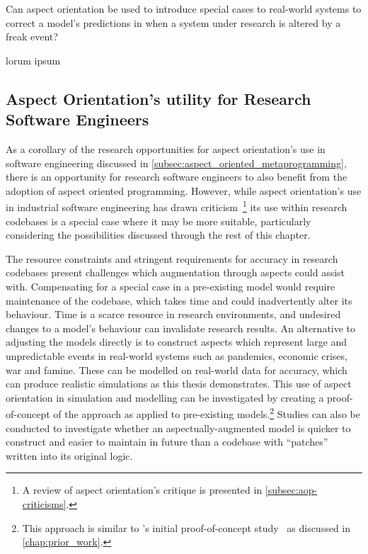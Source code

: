\begin{researchquestion}
Can aspect orientation be used to introduce special cases to real-world systems
to correct a model's predictions in when a system under research is altered by a
freak event?
\end{researchquestion}

lorum  ipsum


\subsection{Aspect Orientation's utility for Research Software Engineers}

As a corollary of the research opportunities for aspect orientation's use in
software engineering discussed in \cref{subsec:aspect_oriented_metaprogramming},
there is an opportunity for research software engineers to also benefit from the
adoption of aspect oriented programming. However, while aspect orientation's use
in industrial software engineering has drawn
criticism~\cite{steimann06paradoxical,przybylek2010wrong,Constantinides04aopconsidered}\footnote{A
review of aspect orientation's critique is presented in
\cref{subsec:aop-criticisms}.} its use within research codebases is a special
case where it may be more suitable, particularly considering the possibilities
discussed through the rest of this chapter.

The resource constraints and stringent requirements for accuracy in research
codebases present challenges which augmentation through aspects could
assist with. Compensating for a special case in a pre-existing model would
require maintenance of the codebase, which takes time and could inadvertently
alter its behaviour. Time is a scarce resource in research environments, and
undesired changes to a model's behaviour can invalidate research results. An
alternative to adjusting the models directly is to construct aspects which
represent large and unpredictable events in real-world systems such as
pandemics, economic crises, war and famine. These can be modelled on real-world
data for accuracy, which can produce realistic simulations as this thesis
demonstrates. This use of aspect orientation in simulation and modelling can be
investigated by creating a proof-of-concept of the approach as applied to
pre-existing models.\footnote{This approach is similar to \pdsf{}'s initial
proof-of-concept study~\cite{wallis2018caise} as discussed in
\cref{chap:prior_work}.} Studies can also be conducted to investigate whether an
aspectually-augmented model is quicker to construct and easier to maintain in
future than a codebase with ``patches'' written into its original logic.

